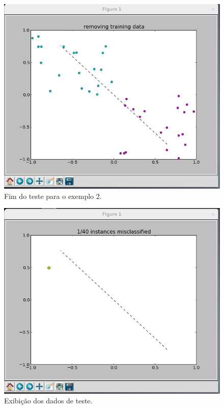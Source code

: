 \documentclass[brazil, a4paper]{article}
\begin{document}
\begin{itemize}
\begin{figure}[!htb]
\centering
\includegraphics[scale=0.25]{ex3-4.png}
\caption{Fim do teste para o exemplo 2.}
\end{figure}

\newpage
\begin{figure}[!htb]
\centering
\includegraphics[scale=0.25]{ex3-t1.png}
\caption{Exibição dos dados de teste.}
\end{figure}


\end{itemize}
\end{document}
